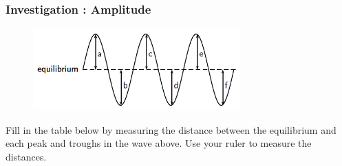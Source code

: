             \subsubsection{  Investigation : Amplitude }
            \nopagebreak
        \label{m38806*id318034}
    \setcounter{subfigure}{0}
	\begin{figure}[H] %
    \begin{center}
    \label{m38806*id318037!!!underscore!!!media}\label{m38806*id318037!!!underscore!!!printimage}\includegraphics[width=300px]{col11305.imgs/m38806_PG10C5_005.png} %
      \vspace{2pt}
    \vspace{.1in}
    \end{center}
 \end{figure}       
        \par 
        \label{m38806*id318043}Fill in the table below by measuring the distance between the equilibrium and each peak and troughs in the wave above. Use your ruler to measure the distances.\par 

